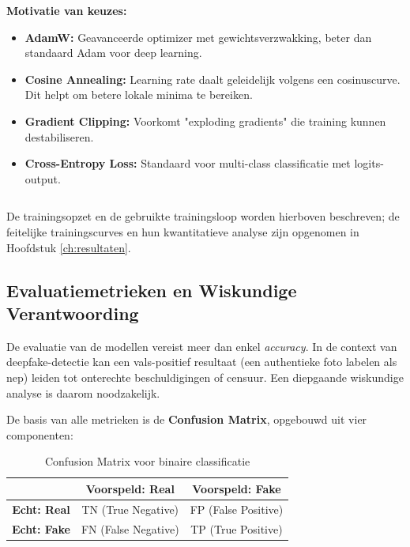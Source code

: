 \textbf{Motivatie van keuzes:}

\begin{itemize}
    \item \textbf{AdamW:} Geavanceerde optimizer met gewichtsverzwakking, beter dan standaard Adam voor deep learning.
    \item \textbf{Cosine Annealing:} Learning rate daalt geleidelijk volgens een cosinuscurve. Dit helpt om betere lokale minima te bereiken.
    \item \textbf{Gradient Clipping:} Voorkomt "exploding gradients" die training kunnen destabiliseren.
    \item \textbf{Cross-Entropy Loss:} Standaard voor multi-class classificatie met logits-output.
\end{itemize}

\begin{listing}[H]
    \inputminted[fontsize=\footnotesize, linenos, frame=lines]{python}{code/training_loop.py}
    \caption{Python script voor de trainingsloop en evaluatiestructuur.}
    \label{lst:training_loop}
\end{listing}

De trainingsopzet en de gebruikte trainingsloop worden hierboven beschreven; de feitelijke trainingscurves en hun kwantitatieve analyse zijn opgenomen in Hoofdstuk \ref{ch:resultaten}.

\subsection{Evaluatiemetrieken en Wiskundige Verantwoording}

De evaluatie van de modellen vereist meer dan enkel \textit{accuracy}. In de context van deepfake-detectie kan een vals-positief resultaat (een authentieke foto labelen als nep) leiden tot onterechte beschuldigingen of censuur. Een diepgaande wiskundige analyse is daarom noodzakelijk.

De basis van alle metrieken is de \textbf{Confusion Matrix}, opgebouwd uit vier componenten:

\begin{table}[h]
\centering
\caption{Confusion Matrix voor binaire classificatie}
\label{tab:confusion_matrix}
\begin{tabular}{c|c|c}
& \textbf{Voorspeld: Real} & \textbf{Voorspeld: Fake} \\
\hline
\textbf{Echt: Real} & TN (True Negative) & FP (False Positive) \\
\textbf{Echt: Fake} & FN (False Negative) & TP (True Positive) \\
\end{tabular}
\end{table}

